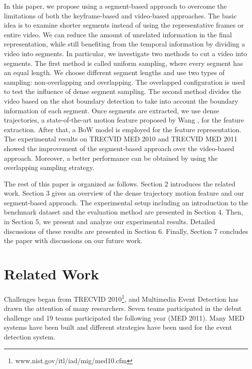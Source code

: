 In this paper, we propose using a segment-based approach to overcome the limitations of both the keyframe-based and video-based approaches. The basic idea is to examine shorter segments instead of using the representative frames or entire video. We can reduce the amount of unrelated information in the final representation, while still benefiting from the temporal information by dividing a video into segments. In particular, we investigate two methods to cut a video into segments. The first method is called uniform sampling, where every segment has an equal length. We choose different segment lengths and use two types of sampling: non-overlapping and overlapping. The overlapped configuration is used to test the influence of dense segment sampling. The second method divides the video based on the shot boundary detection to take into account the boundary information of each segment. Once segments are extracted, we use dense trajectories, a state-of-the-art motion feature proposed by Wang \cite{wang:2011:inria-00583818:1}, for the feature extraction. After that, a BoW model is employed for the feature representation. The experimental results on TRECVID MED 2010 and TRECVID MED 2011 showed the improvement of the segment-based approach over the video-based approach. Moreover, a better performance can be obtained by using the overlapping sampling strategy. 

The rest of this paper is organized as follows. Section 2 introduces the related work. Section 3 gives an overview of the dense trajectory motion feature and our segment-based approach. The experimental setup including an introduction to the benchmark dataset and the evaluation method are presented in Section 4. Then, in Section 5, we present and analyze our experimental results. Detailed discussions of these results are presented in Section 6. Finally, Section 7 concludes the paper with discussions on our future work. 

\section{Related Work}
\label{relatedwork:1}
Challenges began from TRECVID 2010\footnote{www.nist.gov/itl/iad/mig/med10.cfm}, and Multimedia Event Detection has drawn the attention of many researchers. Seven teams participated in the debut challenge and 19 teams participated the following year (MED 2011). Many MED systems have been built and different strategies have been used for the event detection system.

